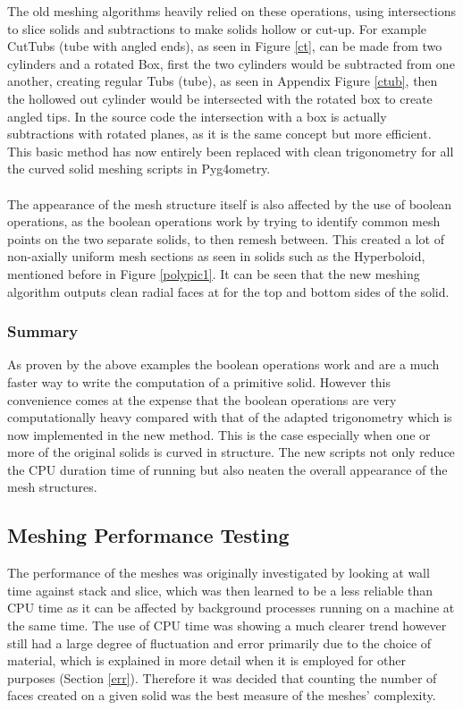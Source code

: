 \documentclass[12pt,a4paper]{article}
\begin{document}
\noindent The old meshing algorithms heavily relied on these operations, using intersections to slice solids and subtractions to make solids hollow or cut-up. For example CutTubs (tube with angled ends), as seen in Figure \ref{ct}, can be made from two cylinders and a rotated Box, first the two cylinders would be subtracted from one another, creating regular Tubs (tube), as seen in Appendix Figure \ref{ctub}, then the hollowed out cylinder would be intersected with the rotated box to create angled tips. In the source code the intersection with a box is actually subtractions with rotated planes, as it is the same concept but more efficient. This basic method has now entirely been replaced with clean trigonometry for all the curved solid meshing scripts in Pyg4ometry.
\\\\
The appearance of the mesh structure itself is also affected by the use of boolean operations, as the boolean operations work by trying to identify common mesh points on the two separate solids, to then remesh between. This created a lot of non-axially uniform mesh sections as seen in solids such as the Hyperboloid, mentioned before in Figure \ref{polypic1}. It can be seen that the new meshing algorithm outputs clean radial faces at for the top and bottom sides of the solid.

\subsubsection{Summary}
As proven by the above examples the boolean operations work and are a much faster way to write the computation of a primitive solid. However this convenience comes at the expense that the boolean operations are very computationally heavy compared with that of the adapted trigonometry which is now implemented in the new method. This is the case especially when one or more of the original solids is curved in structure. The new scripts not only reduce the CPU duration time of running but also neaten the overall appearance of the mesh structures.

\subsection{Meshing Performance Testing}\label{per}
The performance of the meshes was originally investigated by looking at wall time against stack and slice, which was then learned to be a less reliable than CPU time as it can be affected by background processes running on a machine at the same time. The use of CPU time was showing a much clearer trend however still had a large degree of fluctuation and error primarily due to the choice of material, which is explained in more detail when it is employed for other purposes (Section \ref{err}). Therefore it was decided that counting the number of faces created on a given solid was the best measure of the meshes' complexity.
\end{document}
